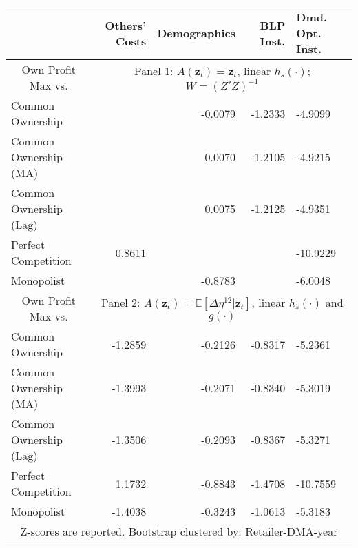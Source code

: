 \begin{tabular}{l r r r b }
\toprule
                        &  Others' Costs &  Demographics &  BLP Inst. &  Dmd. Opt. Inst. \\
\midrule
\multicolumn{1}{c}{Own Profit Max vs.}& \multicolumn{4}{c}{Panel 1: $A(\mathbf{z}_t) = \mathbf{z}_t$, linear $h_s(\cdot)$; $W=(Z'Z)^{-1}$ }\\
\cmidrule(lr){1-1} \cmidrule(lr){2-5}
 Common Ownership &         \cellcolor[HTML]{C0C0C0}{-2.4732} &       -0.0079 &    -1.2333 &          -4.9099 \\
  Common Ownership (MA) &         \cellcolor[HTML]{C0C0C0}{-2.5918} &        0.0070 &    -1.2105 &          -4.9215 \\
 Common Ownership (Lag) &         \cellcolor[HTML]{C0C0C0}{-2.5208} &        0.0075 &    -1.2125 &          -4.9351 \\
                Perfect Competition &         0.8611 &        \cellcolor[HTML]{C0C0C0}{-2.3033}  &     \cellcolor[HTML]{C0C0C0}{-3.1652} &         -10.9229 \\
      Monopolist &         \cellcolor[HTML]{C0C0C0}{-2.4166} &       -0.8783 &     \cellcolor[HTML]{C0C0C0}{-3.5162} &          -6.0048 \\
 
\midrule
\multicolumn{1}{c}{Own Profit Max vs.}& \multicolumn{4}{c}{Panel 2:  $A(\mathbf{z}_t) = \mathbb{E}[\Delta\eta^{12}|\mathbf{z}_t]$, linear $h_s(\cdot)$ and $g(\cdot)$}\\
\cmidrule(lr){1-1} \cmidrule(lr){2-5}
       Common Ownership &        -1.2859 &       -0.2126 &    -0.8317 &          -5.2361 \\
  Common Ownership (MA) &        -1.3993 &       -0.2071 &    -0.8340 &          -5.3019 \\
 Common Ownership (Lag) &        -1.3506 &       -0.2093 &    -0.8367 &          -5.3271 \\
    Perfect Competition &         1.1732 &       -0.8843 &    -1.4708 &         -10.7559 \\
      Monopolist &        -1.4038 &       -0.3243 &    -1.0613 &          -5.3183 \\
\bottomrule
\multicolumn{5}{c}{Z-scores are reported. Bootstrap clustered by: Retailer-DMA-year}
\end{tabular}
